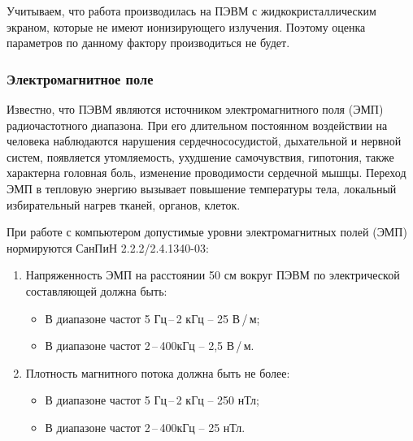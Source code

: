 Учитываем, что работа производилась на ПЭВМ с жидкокристаллическим экраном, которые не имеют ионизирующего излучения. 
Поэтому оценка параметров по данному фактору производиться не будет.


\subsubsection{Электромагнитное поле}

Известно, что ПЭВМ являются источником электромагнитного поля (ЭМП) радиочастотного диапазона. 
При его длительном постоянном воздействии на человека наблюдаются нарушения сердечнососудистой, дыхательной и нервной систем, появляется утомляемость, ухудшение самочувствия, гипотония, также характерна головная боль, изменение проводимости сердечной мышцы. 
Переход ЭМП в тепловую энергию вызывает повышение температуры тела, локальный избирательный нагрев тканей, органов, клеток.

При работе с компьютером допустимые уровни электромагнитных полей (ЭМП) нормируются СанПиН 2.2.2/2.4.1340-03:
\begin{enumerate}
    \item Напряженность ЭМП на расстоянии 50 см вокруг ПЭВМ по электрической составляющей должна быть:
    \begin{itemize}[leftmargin=+]
        \item В диапазоне частот 5 Гц\,--\,2 кГц -- 25 В\,/\,м;
        \item В диапазоне частот 2\,--\,400кГц -- 2,5 В\,/\,м.
    \end{itemize}
    \item Плотность магнитного потока должна быть не более:
    \begin{itemize}[leftmargin=+]
        \item В диапазоне частот 5 Гц\,--\,2 кГц -- 250 нТл;
        \item В диапазоне частот 2\,--\,400кГц -- 25 нТл.
    \end{itemize}
\end{enumerate}

